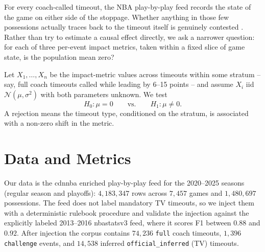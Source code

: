 \documentclass[twoside,11pt]{article}
\begin{document}
For every coach-called timeout, the NBA play-by-play feed records the
state of the game on either side of the stoppage. Whether anything in
those few possessions actually traces back to the timeout itself is
genuinely contested
\citep{assis2020stop,gibbs2021causal,weimer2023causal,qiu2025interrupt}.
Rather than try to estimate a causal effect directly, we ask a narrower
question: for each of three per-event impact metrics, taken within a
fixed slice of game state, is the population mean zero?

Let $X_1,\dots,X_n$ be the impact-metric values across timeouts within
some stratum -- say, full coach timeouts called while leading by 6--15
points -- and assume $X_i$ iid $\mathcal{N}(\mu, \sigma^2)$ with both
parameters unknown. We test
\begin{equation}
		H_0\!: \mu = 0 \qquad \text{vs.} \qquad H_1\!: \mu \neq 0.
		\label{eq:hyp}
\end{equation}
A rejection means the timeout type, conditioned on the stratum, is
associated with a non-zero shift in the metric.

\section{Data and Metrics}
\label{sec:data}

Our data is the cdnnba enriched play-by-play feed for the 2020--2025
seasons (regular season and playoffs): $4{,}183{,}347$ rows across
$7{,}457$ games and $1{,}480{,}697$ possessions. The feed does not
label mandatory TV timeouts, so we inject them with a deterministic
rulebook procedure and validate the injection against the explicitly
labeled 2013--2016 nbastatsv3 feed, where it scores F1 between $0.88$
and $0.92$. After injection the corpus contains $74{,}236$ \texttt{full}
coach timeouts, $1{,}396$ \texttt{challenge} events, and $14{,}538$
inferred \texttt{official\_inferred} (TV) timeouts.
\end{document}
